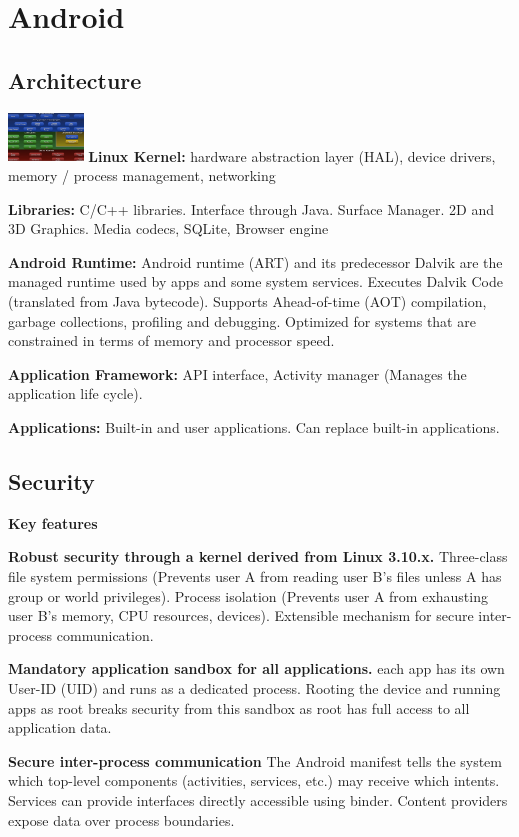 \section{Android}

\subsection{Architecture}
\includegraphics[width=0.15\textwidth]{android/architecture.png}
\textbf{Linux Kernel:} hardware abstraction layer (HAL), device drivers, memory
/ process management, networking

\textbf{Libraries:} C/C++ libraries. Interface through Java. Surface Manager.
2D and 3D Graphics. Media codecs, SQLite, Browser engine

\textbf{Android Runtime:}
Android runtime (ART) and its predecessor Dalvik are the managed runtime used
by apps and some system services.
Executes Dalvik Code (translated from Java bytecode).
Supports Ahead-of-time (AOT) compilation, garbage collections, profiling and
debugging.
Optimized for systems that are constrained in terms of memory and processor
speed.

\textbf{Application Framework:}
API interface, Activity manager (Manages the application life cycle).

\textbf{Applications:}
Built-in and user applications. Can replace built-in applications.

\subsection{Security}
\textbf{Key features}

\textbf{Robust security through a kernel derived from Linux 3.10.x.}
Three-class file system permissions (Prevents user A from reading user B’s
files unless A has group or world privileges). Process isolation (Prevents user
A from exhausting user B’s memory, CPU resources, devices). Extensible
mechanism for secure inter-process communication.

\textbf{Mandatory application sandbox for all applications.}
each app has its own User-ID (UID) and runs as a dedicated process. Rooting the
device and running apps as root breaks security from this sandbox as root has
full access to all application data.

\textbf{Secure inter-process communication}
The Android manifest tells the system which top-level components (activities,
services, etc.) may receive which intents. Services can provide interfaces
directly accessible using binder. Content providers expose data over process
boundaries.


